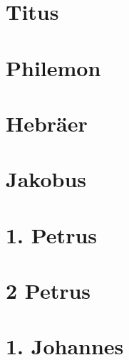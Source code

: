 \chapter{Titus}
\begin{multicols}{2}
  \raggedcolumns
  \parskip=0pt \relax
  
\end{multicols}

\chapter{Philemon}
\begin{multicols}{2}
  \raggedcolumns
  \parskip=0pt \relax
  
\end{multicols}

\chapter{Hebräer}
\begin{multicols}{2}
  \raggedcolumns
  \parskip=0pt \relax
  
\end{multicols}

\chapter{Jakobus}
\begin{multicols}{2}
  \raggedcolumns
  \parskip=0pt \relax
  
\end{multicols}

\chapter{1. Petrus}
\begin{multicols}{2}
  \raggedcolumns
  \parskip=0pt \relax
  
\end{multicols}

\chapter{2 Petrus}
\begin{multicols}{2}
  \raggedcolumns
  \parskip=0pt \relax
  
\end{multicols}

\chapter{1. Johannes}
\begin{multicols}{2}
  \raggedcolumns
  \parskip=0pt \relax
  
\end{multicols}

